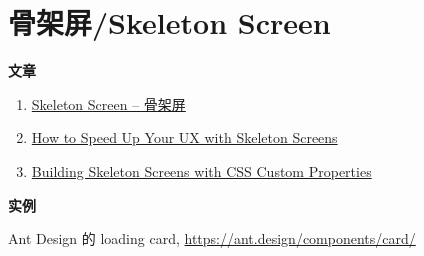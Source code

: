 \section{骨架屏/Skeleton
Screen}\label{ux9aa8ux67b6ux5c4fskeleton-screen}

\textbf{文章}

\begin{enumerate}
\def\labelenumi{\arabic{enumi}.}
\tightlist
\item
  \href{http://www.bestvist.com/2018/01/19/skeleton-screen/}{Skeleton
  Screen -- 骨架屏}
\item
  \href{https://www.sitepoint.com/how-to-speed-up-your-ux-with-skeleton-screens/}{How
  to Speed Up Your UX with Skeleton Screens}
\item
  \href{https://css-tricks.com/building-skeleton-screens-css-custom-properties/}{Building
  Skeleton Screens with CSS Custom Properties}
\end{enumerate}

\textbf{实例}

Ant Design 的 loading card, \url{https://ant.design/components/card/}
